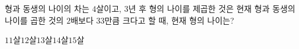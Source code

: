 형과 동생의 나이의 차는 $4$살이고, $3$년 후 형의 나이를 제곱한 것은 현재 형과 동생의 나이를 곱한 것의 $2$배보다 $33$만큼 크다고 할 때, 현재 형의 나이는?
\begin{choices32}{$11$살}{$12$살}{$13$살}{$14$살}{$15$살}\end{choices32}

